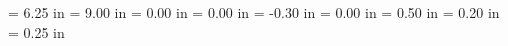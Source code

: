 %
%
 \textwidth		 = 6.25 in
 \textheight	 = 9.00 in
 \oddsidemargin	 = 0.00 in
 \evensidemargin = 0.00 in
 \topmargin		 = -0.30 in
 \headheight	 = 0.00 in
 \headsep		 = 0.50 in
 \parskip		 = 0.20 in
 \parindent		 = 0.25 in

